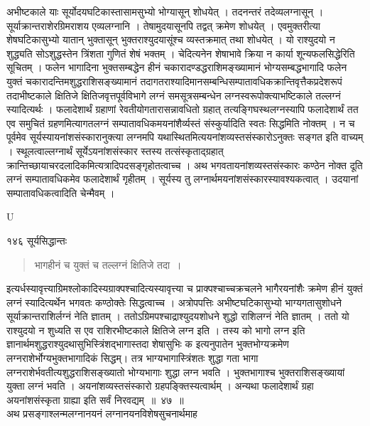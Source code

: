 \documentclass[11pt, openany]{book}
\begin{document}
\begin{sloppypar}
 अभीष्टकाले याः सूर्योदयघटिकास्तासामसुभ्यो भोग्यासून् शोधयेत् । तदनन्तरं तदेव्यलग्नासून् । सूर्याक्रान्तराशेरग्रिमराशय एव्यलग्नानि । तेषामुदयासूनपि तद्वत् क्रमेण शोधयेत् । एवमुक्तरीत्या शेषघटिकासुभ्यो यातान् भुक्तासून् भुक्तराश्युदयासूंश्च व्यस्तक्रमात् तथा शोधयेत् । यो राश्युदयो न शुद्ध्यति सोऽशुद्धस्तेन त्रिंशता गुणितं शेषं भक्तम् । चेदित्यनेन शेषाभावे क्रिया न कार्या शून्यफलसिद्धेरिति सूचितम् । फलेन भागादिना भुक्तसम्बद्धेन हीनं चकारादण्डद्धराशिमङ्ख्यामानं भोग्यसम्बद्धभागादि फलेन युक्तं चकारादन्तिमशुद्धराशिसङ्ख्यामानं तदागतराश्यादिमानसम्बन्धिसम्पातावधिकक्रान्तिवृत्तैकप्रदेशरूपं तदाभीष्टकाले क्षितिजे क्षितिजवृत्तपूर्वविभागे लग्नं समसूत्रसम्बन्धेन लग्नस्वरूपोक्त्याभष्टिकाले तल्लग्नं स्यादित्यर्थः । फलादेशार्थं ग्रहाणां रेवतीयोगतारासन्नावधितो ग्रहात् तत्यङ्गिघस्थलग्नस्यापि फलादेशार्थं तत एव समुचितं ग्रहणमित्यागतलग्नं सम्पातावधिकमयनांशैर्व्यस्तं संस्कुर्यादिति स्वतः सिद्धमिति नोक्तम् । न च पूर्वमेव सूर्यस्यायनांशसंस्कारानुक्त्या लग्नमपि यथास्थितमित्ययनांशव्यस्तसंस्कारोऽनुक्तः सङ्गत इति वाच्यम् । स्थूलत्वाल्लग्नार्थं सूर्येऽयनांशसंस्कार स्तस्य तत्संस्कृताद्ग्रहात् क्रान्तिच्छायाचरदलादिकमित्यत्रादिपदसङ्गृहोतत्वाच्च । अथ भगवतायनांशव्यस्तसंस्कारः कण्ठेन नोक्त दूति लग्नं सम्पातावधिकमेव फलादेशार्थं गृहीतम् । सूर्यस्य तु लग्नार्थमयनांशसंस्कारस्यावश्यकत्वात् । उदयानां सम्पातावधिकत्वादिति चेन्मैवम् ।
\end{sloppypar}

{\tiny{U}}

\newpage


\noindent १४६ \hspace{4cm} सूर्यसिद्धान्तः 
\vspace{1cm}


\begin{quote}
 {\qt भागहीनं च युक्तं च तल्लग्नं क्षितिजे तदा~।}
 \end{quote}
 
 \begin{sloppypar}
इत्यर्धस्यावृत्त्याग्रिमश्लोकादिस्यग्राक्पश्चादित्यस्यावृत्त्या च प्राक्पश्चाच्चक्रचलने भागैरयनांशैः क्रमेण हीनं युक्तं लग्नं स्यादित्यर्थेन भगवतः कण्ठोक्तेः सिद्धत्वाच्च । अत्रोपपत्तिः अभीष्टघटिकासुभ्यो भाग्यगतासुशोधने सूर्याक्रान्तराशिर्लग्नं नेति ज्ञातम् । ततोऽग्रिमपश्चाद्राश्युदयशोधने शुद्धो राशिलग्नं नेति ज्ञातम् । ततो यो राश्युदयो न शुध्यति स एव राशिरभीष्टकाले क्षितिजे लग्न इति । तस्य को भागो लग्न इति ज्ञानार्थमशुद्धराश्युदथासुभिस्त्रिंशद्भागास्तदा शेषासुभिः क इत्यनुपातेन भुक्तभोग्यक्रमेण लग्नराशेर्भोग्यभुक्तभागादिकं सिद्धम्। तत्र भाग्यभागास्त्रिंशतः शुद्धा गता भागा लग्नराशेर्भवतीत्यशुद्धराशिसङ्ख्यातो भोग्यभागाः शुद्धा लग्न भवति । भुक्तभागाश्च भुक्तराशिसङ्ख्यायां युक्ता लग्नं भवति । अयनांशव्यस्तसंस्कारो ग्रहपङ्क्तिस्यत्वार्थम् । अन्यथा फलादेशार्थं ग्रहा अयनांशसंस्कृता ग्राह्या इति सर्वं निरवद्यम्~॥~४७~॥\\
\noindent अथ प्रसङ्गाश्लन्मलग्नानयनं लग्नानयनविशेषसुचनार्थमाह\textendash
\end{sloppypar}
\end{document}
